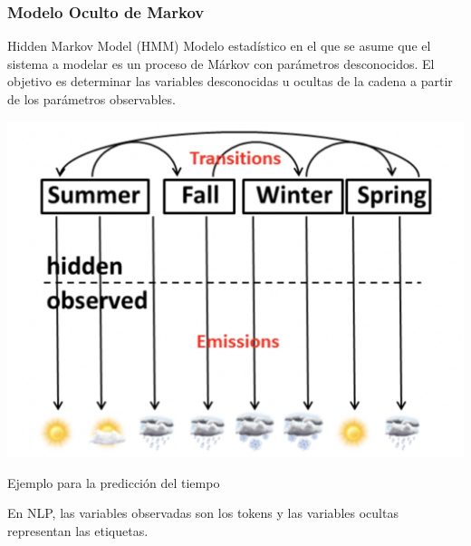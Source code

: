 \documentclass[
10pt, %
aspectratio=169, %
]{beamer}
\begin{document}
	
	\begin{frame}
		
		\frametitle{Modelo Oculto de Markov}
		
		\begin{block}{Hidden Markov Model (HMM)}
			Modelo estadístico en el que se asume que el sistema a modelar es un proceso de Márkov con parámetros desconocidos. El objetivo es determinar las variables desconocidas u ocultas de la cadena a partir de los parámetros observables. 
		\end{block}
		
		\pause
		\noindent\begin{minipage}{.4\textwidth}
			\centering	
			\includegraphics[scale=0.38]{cadena-oculta-markov.png} 
		\end{minipage}%
		\begin{minipage}{.55\textwidth}
			
			\begin{adjustwidth}{1.5cm}{} 
				
				Ejemplo para la predicción del tiempo 
				
				\pause
				\vspace{2\baselineskip}
				En NLP, las variables observadas son los tokens y las variables ocultas representan las etiquetas.
			\end{adjustwidth}
		\end{minipage}
		
	\end{frame}
	
\end{document}
